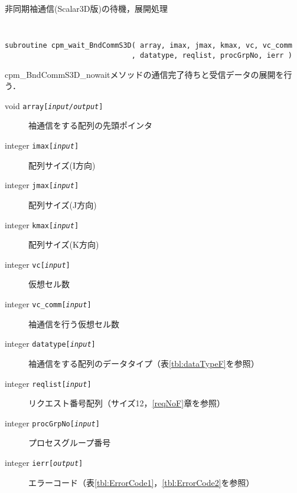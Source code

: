 \begin{spacing}{0.8}
\begin{itembox}[l]{非同期袖通信(Scalar3D版)の待機，展開処理}
{\tt
\begin{verbatim}
subroutine cpm_wait_BndCommS3D( array, imax, jmax, kmax, vc, vc_comm
                              , datatype, reqlist, procGrpNo, ierr )
\end{verbatim}
}
cpm\_BndCommS3D\_nowaitメソッドの通信完了待ちと受信データの展開を行う．
\begin{description}
\item[void    {\tt array[{\it input/output}]}] 袖通信をする配列の先頭ポインタ
\item[integer {\tt imax[{\it input}]}] 配列サイズ(I方向)
\item[integer {\tt jmax[{\it input}]}] 配列サイズ(J方向)
\item[integer {\tt kmax[{\it input}]}] 配列サイズ(K方向)
\item[integer {\tt vc[{\it input}]}] 仮想セル数
\item[integer {\tt vc\_comm[{\it input}]}] 袖通信を行う仮想セル数
\item[integer {\tt datatype[{\it input}]}] 袖通信をする配列のデータタイプ（表\ref{tbl:dataTypeF}を参照）
\item[integer {\tt reqlist[{\it input}]}] リクエスト番号配列（サイズ12，\ref{reqNoF}章を参照）
\item[integer {\tt procGrpNo[{\it input}]}] プロセスグループ番号
\item[integer {\tt ierr[{\it output}]}] エラーコード（表\ref{tbl:ErrorCode1}，\ref{tbl:ErrorCode2}を参照）
\end{description}
\end{itembox}\\
\end{spacing}

